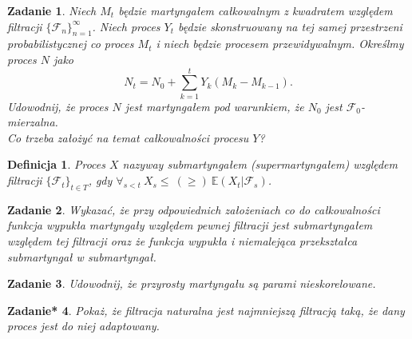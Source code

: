 \documentclass{mwart}
\newtheorem{df}{Definicja}
\newtheorem{zd}{Zadanie}
\newtheorem{zdt}[zd]{Zadanie*}
\begin{document}
\begin{zd}
Niech $M_t$ będzie martyngałem całkowalnym z kwadratem względem filtracji $\{\mathcal{F}_n\}_{n=1}^{\infty}$. Niech proces $Y_t$ będzie skonstruowany na tej samej przestrzeni probabilistycznej co proces $M_t$ i niech będzie procesem przewidywalnym. Określmy proces $N$ jako
\begin{displaymath}
N_t = N_0 + \sum_{k=1}^tY_k\left(M_k - M_{k-1}\right).
\end{displaymath}
Udowodnij, że proces $N$ jest martyngałem pod warunkiem, że $N_0$ jest $\mathcal{F}_0$-mierzalna.\\
Co trzeba założyć na temat całkowalności procesu $Y$?
\end{zd}

\begin{df}
Proces $X$ nazyway submartyngałem (supermartyngałem) względem filtracji $\{\mathcal{F}_t\}_{t\in T}$, gdy $\forall_{s <t}\ X_s \leq \ (\geq)\ \mathbb{E}\left(X_t|\mathcal{F}_s\right)$.
\end{df}

\begin{zd}
Wykazać, że przy odpowiednich założeniach co do całkowalności funkcja wypukła martyngały względem pewnej filtracji jest submartyngałem względem tej filtracji oraz że funkcja wypukła i niemalejąca przekształca submartyngał w submartyngał.
\end{zd}

\begin{zd}
Udowodnij, że przyrosty martyngału są parami nieskorelowane.
\end{zd}

\begin{zdt}
Pokaż, że filtracja naturalna jest najmniejszą filtracją taką, że dany proces jest do niej adaptowany.
\end{zdt}
\end{document}
